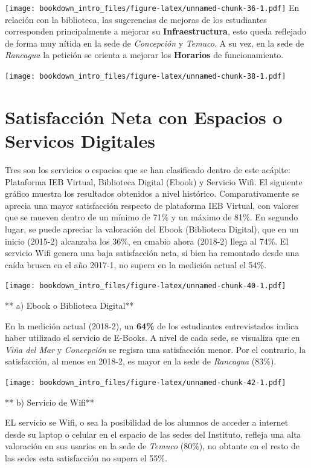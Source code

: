 \documentclass[]{book}
\begin{document}
\texttt{[image: bookdown\_intro\_files/figure-latex/unnamed-chunk-36-1.pdf]}
En relación con la biblioteca, las sugerencias de mejoras de los
estudiantes corresponden principalmente a mejorar su
\textbf{Infraestructura}, esto queda reflejado de forma muy nítida en la
sede de \emph{Concepción} y \emph{Temuco}. A su vez, en la sede de
\emph{Rancagua} la petición se orienta a mejorar los \textbf{Horarios}
de funcionamiento.

\texttt{[image: bookdown\_intro\_files/figure-latex/unnamed-chunk-38-1.pdf]}

\section{Satisfacción Neta con Espacios o Servicos
Digitales}\label{satisfaccion-neta-con-espacios-o-servicos-digitales}

Tres son los servicios o espacios que se han clasificado dentro de este
acápite: Plataforma IEB Virtual, Biblioteca Digital (Ebook) y Servicio
Wifi. El siguiente gráfico muestra los resultados obtenidos a nivel
histórico. Comparativamente se aprecia una mayor satisfacción respecto
de plataforma IEB Virtual, con valores que se mueven dentro de un mínimo
de 71\% y un máximo de 81\%. En segundo lugar, se puede apreciar la
valoración del Ebook (Biblioteca Digital), que en un inicio (2015-2)
alcanzaba los 36\%, en cmabio ahora (2018-2) llega al 74\%. El servicio
Wifi genera una baja satisfacción neta, si bien ha remontado desde una
caída brusca en el año 2017-1, no supera en la medición actual el 54\%.

\texttt{[image: bookdown\_intro\_files/figure-latex/unnamed-chunk-40-1.pdf]}

** a) Ebook o Biblioteca Digital**

En la medición actual (2018-2), un \textbf{64\%} de los estudiantes
entrevistados indica haber utilizado el servicio de E-Books. A nivel de
cada sede, se visualiza que en \emph{Viña del Mar} y \emph{Concepción}
se regisra una satisfacción menor. Por el contrario, la satisfacción, al
menos en 2018-2, es mayor en la sede de \emph{Rancagua} (83\%).

\texttt{[image: bookdown\_intro\_files/figure-latex/unnamed-chunk-42-1.pdf]}

** b) Servicio de Wifi**

EL servicio se Wifi, o sea la posibilidad de los alumnos de acceder a
internet desde su laptop o celular en el espacio de las sedes del
Instituto, refleja una alta valoración en sus usarios en la sede de
\emph{Temuco} (80\%), no obtante en el resto de las sedes esta
satisfacción no supera el 55\%.
\end{document}
